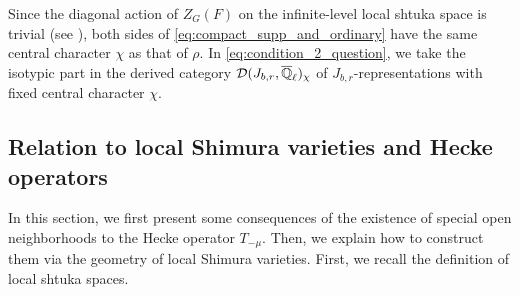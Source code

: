 \documentclass[12pt,reqno]{amsart}
\begin{document}
Since the diagonal action of $Z_G(F)$ on the infinite-level local shtuka space is trivial (see ), both sides of \eqref{eq:compact_supp_and_ordinary} have the same central character $\chi$ as that of $\rho$. In \eqref{eq:condition_2_question}, we take the isotypic part in the derived category ${\mathcal{D}}(J_{b, r}, {\overline{\mathbb{Q}}_\ell})_\chi$ of $J_{b,r}$-representations with fixed central character $\chi$. 


\subsection{Relation to local Shimura varieties and Hecke operators}

In this section, we first present some consequences of the existence of special open neighborhoods to the Hecke operator $T_{-\mu}$. Then, we explain how to construct them via the geometry of local Shimura varieties. First, we recall the definition of local shtuka spaces. 
\end{document}
